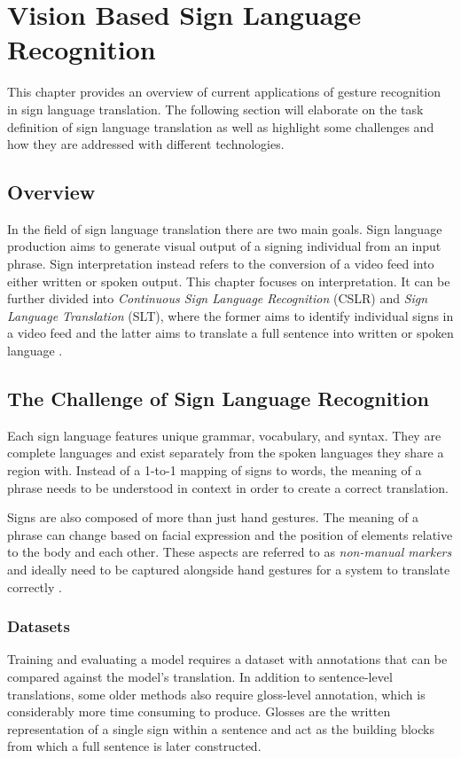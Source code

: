 \chapter{Vision Based Sign Language Recognition}
This chapter provides an overview of current applications of gesture recognition in sign language translation. The following section will elaborate on the task definition of sign language translation as well as highlight some challenges and how they are addressed with different technologies.
 
\section{Overview}
In the field of sign language translation there are two main goals. Sign language production \cite{saundersSigningScaleLearning2022} aims to generate visual output of a signing individual from an input phrase. Sign interpretation instead refers to the conversion of a video feed into either written or spoken output. This chapter focuses on interpretation. It can be further divided into \textit{Continuous Sign Language Recognition} (CSLR) and \textit{Sign Language Translation} (SLT), where the former aims to identify individual signs in a video feed and the latter aims to translate a full sentence into written or spoken language \cite{cihancamgozSignLanguageTransformers2020}.
 
\section{The Challenge of Sign Language Recognition}
Each sign language features unique grammar, vocabulary, and syntax. They are complete languages and exist separately from the spoken languages they share a region with. Instead of a 1-to-1 mapping of signs to words, the meaning of a phrase needs to be understood in context in order to create a correct translation.
 
Signs are also composed of more than just hand gestures. The meaning of a phrase can change based on facial expression and the position of elements relative to the body and each other. These aspects are referred to as \textit{non-manual markers} and ideally need to be captured alongside hand gestures for a system to translate correctly \cite{goldin-meadowGestureSignLanguage2017}. 
 
\subsection{Datasets}
Training and evaluating a model requires a dataset with annotations that can be compared against the model's translation. In addition to sentence-level translations, some older methods also require gloss-level annotation, which is considerably more time consuming to produce. Glosses are the written representation of a single sign within a sentence and act as the building blocks from which a full sentence is later constructed.
 
